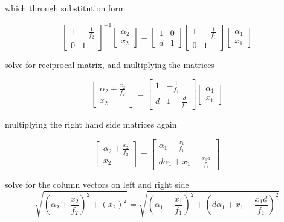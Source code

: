 \documentclass[main.tex]{subfiles}
\begin{document}
which through substitution form

\[
\begin{bmatrix}
    1   & -\frac{1}{f_2} \\
    0   &   1
\end{bmatrix}^{-1}
\begin{bmatrix}
    \alpha_2 \\
    x_2
\end{bmatrix}
=
\begin{bmatrix}
    1   &   0 \\
    d   &   1
\end{bmatrix}
\begin{bmatrix}
    1   & -\frac{1}{f_1} \\
    0   &   1
\end{bmatrix}
\begin{bmatrix}
     \alpha_{1} \\
    x_1
\end{bmatrix}
\]

solve for reciprocal matrix, and multiplying the matrices 

\[
\begin{bmatrix}
    \alpha_2 + \frac{x_2}{f_2}\\
    x_2
\end{bmatrix}
=
\begin{bmatrix}
    1   & -\frac{1}{f_1} \\
    d   & 1 -\frac{d}{f_1}  
\end{bmatrix}
\begin{bmatrix}
    \alpha_{1} \\
    x_1
\end{bmatrix}
\]

multiplying the right hand side matrices again

\[
\begin{bmatrix}
    \alpha_2 + \frac{x_2}{f_2}\\
    x_2
\end{bmatrix}
=
\begin{bmatrix}
    \alpha_1 - \frac{x_1}{f_1} \\
    d\alpha_1 + x_1 - \frac{x_1 d}{f_1}
\end{bmatrix}
\]

solve for the column vectors on left and right side\\

\begin{equation}
\sqrt{(\alpha_2 + \frac{x_2}{f_2})^2 + (x_2)^2} = \sqrt{(\alpha_1 - \frac{x_1}{f_1})^2 + (d\alpha_1 + x_1 - \frac{x_1 d}{f_1})^2}
\end{equation}
\end{document}

